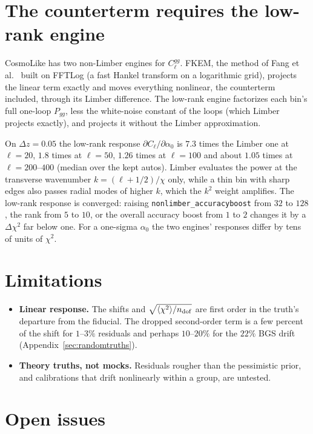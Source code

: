 \documentclass[11pt]{article}
\newcommand{\chidof}{\sqrt{\langle \chi^2 \rangle / n_{\rm dof}}}
\begin{document}
\section{The counterterm requires the low-rank engine}
\label{app:counterterm}

CosmoLike has two non-Limber engines for $C_\ell^{gg}$.  FKEM, the
method of Fang et al.~\cite{FangKEM2020} built on FFTLog (a fast
Hankel transform on a logarithmic grid), projects the linear
term exactly and moves everything nonlinear, the counterterm included,
through its Limber difference.  The low-rank engine factorizes each
bin's full one-loop $P_{gg}$, less the white-noise constant of the
loops (which Limber projects exactly), and projects it without the
Limber approximation.

On $\Delta z = 0.05$ the low-rank response
$\partial C_\ell/\partial\alpha_0$ is $7.3$ times the Limber one at
$\ell = 20$, $1.8$ times at $\ell = 50$, $1.26$ times at $\ell = 100$
and about $1.05$ times at $\ell = 200$--$400$ (median over the kept
autos).  Limber evaluates the power at the transverse wavenumber
$k = (\ell + 1/2)/\chi$ only, while a thin bin with sharp edges also
passes radial modes of higher $k$, which the $k^2$ weight amplifies.
The low-rank response is converged: raising
\texttt{nonlimber\_accuracyboost} from $32$ to $128$, the rank from $5$
to $10$, or the overall accuracy boost from $1$ to $2$ changes it by a
$\Delta\chi^2$ far below one.  For a one-sigma $\alpha_0$ the two
engines' responses differ by tens of units of $\chi^2$.

\section{Limitations}
\label{app:limits}

\begin{itemize}
  \item \textbf{Linear response.}  The shifts and $\chidof$ are first
    order in the truth's departure from the fiducial.  The dropped
    second-order term is a few percent of the shift for $1$--$3\%$
    residuals and perhaps $10$--$20\%$ for the $22\%$ BGS drift
    (Appendix~\ref{sec:randomtruths}).
  \item \textbf{Theory truths, not mocks.}  Residuals rougher than the
    pessimistic prior, and calibrations that drift nonlinearly within a
    group, are untested.
\end{itemize}

\section{Open issues}
\label{app:open}
\end{document}

